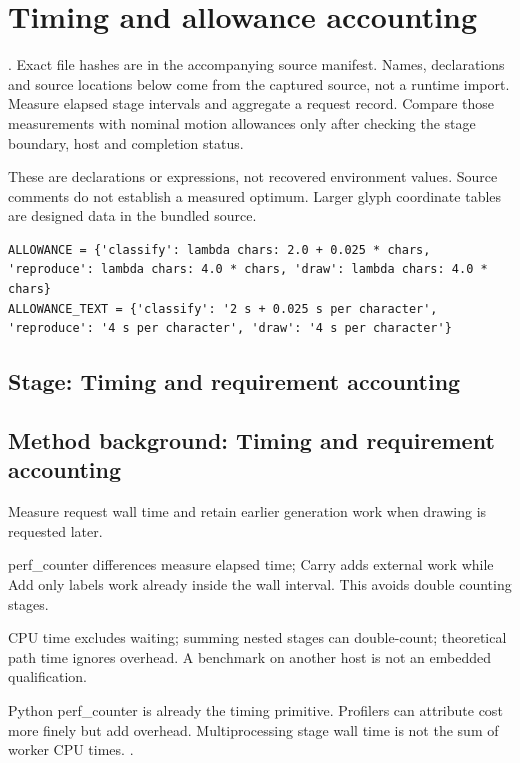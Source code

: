 \chapter{Timing and allowance accounting}\label{module:timing}
. Exact file hashes are in the accompanying source manifest. Names, declarations and source locations below come from the captured source, not a runtime import.
Measure elapsed stage intervals and aggregate a request record. Compare those measurements with nominal motion allowances only after checking the stage boundary, host and completion status.


These are declarations or expressions, not recovered environment values. Source comments do not establish a measured optimum. Larger glyph coordinate tables are designed data in the bundled source.
\begin{lstlisting}[style=plain]
ALLOWANCE = {'classify': lambda chars: 2.0 + 0.025 * chars, 'reproduce': lambda chars: 4.0 * chars, 'draw': lambda chars: 4.0 * chars}
ALLOWANCE_TEXT = {'classify': '2 s + 0.025 s per character', 'reproduce': '4 s per character', 'draw': '4 s per character'}
\end{lstlisting}
\section*{Stage: Timing and requirement accounting}
\section{Method background: Timing and requirement accounting}\label{method:timing}
Measure request wall time and retain earlier generation work when drawing is requested later.


perf\_counter differences measure elapsed time; Carry adds external work while Add only labels work already inside the wall interval. This avoids double counting stages.


CPU time excludes waiting; summing nested stages can double-count; theoretical path time ignores overhead. A benchmark on another host is not an embedded qualification.


Python perf\_counter is already the timing primitive. Profilers can attribute cost more finely but add overhead. Multiprocessing stage wall time is not the sum of worker CPU times. \cite{pythontime,code2026}.


